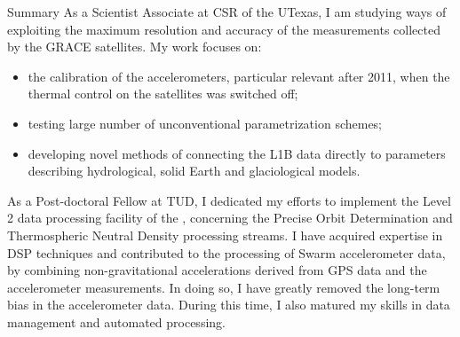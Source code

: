 \begin{cvtext}{Summary}
As a Scientist Associate at \ac{CSR} of the \ac{UTexas}, I am studying ways of exploiting the maximum resolution and accuracy of the measurements collected by the \ac{GRACE} satellites.
My work focuses on:
\begin{itemize}[topsep=0pt,itemsep=1pt,parsep=0pt,partopsep=0pt]
\item the calibration of the accelerometers, particular relevant after 2011, when the thermal control on the satellites was switched off;
\item testing large number of unconventional parametrization schemes;
\item developing novel methods of connecting the L1B data directly to parameters describing hydrological, solid Earth and glaciological models.
\end{itemize}

As a Post-doctoral Fellow at \ac{TUD}, I dedicated my efforts to implement the Level 2 data processing facility of the , concerning the Precise Orbit Determination and Thermospheric Neutral Density processing streams.
I have acquired expertise in \ac{DSP} techniques and contributed to the processing of Swarm accelerometer data, by combining non-gravitational accelerations derived from \ac{GPS} data and the accelerometer measurements.
In doing so, I have greatly removed the long-term bias in the accelerometer data.
During this time, I also matured my skills in data management and automated processing.


\end{cvtext}
